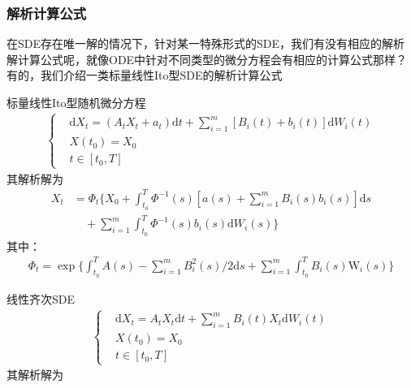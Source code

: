         \subsubsection{解析计算公式}
            \label{subsubsec:解析计算公式}
            \par
            在SDE存在唯一解的情况下，针对某一特殊形式的SDE，我们有没有相应的解析解计算公式呢，就像ODE中针对不同类型的微分方程会有相应的计算公式那样？有的，我们介绍一类标量线性Ito型SDE的解析计算公式
            \par
            标量线性Ito型随机微分方程
            \begin{align*}
                \left\{
                    \begin{aligned}
                    &\mathrm{d}X_t = (A_tX_t +a_t) \mathrm{d}t + \sum_{i = 1}^m[B_i(t) + b_i(t)]\mathrm{d}W_i(t)\\
                    &X(t_0) = X_0\\
                    &t \in [t_0,T]
                    \end{aligned}
                \right.
            \end{align*}
            其解析解为
            \begin{align*}
                X_t &= \varPhi_t\Bigg\{X_0+\int_{t_0}^T \varPhi^{-1}(s)\left[ a(s)+\sum_{i = 1}^m B_i(s)b_i(s)  \right]\mathrm{d}s \\
            &\quad + \sum_{i =1}^m \int_{t_0}^T \varPhi^{-1}(s)b_i(s)\mathrm{d}W_i(s) \Bigg\}
            \end{align*}
            其中：
            \begin{align*}
                \varPhi_t = \exp\Bigg \{ \int_{t_0}^TA(s) - \sum_{i = 1}^mB_i^2(s)/2\mathrm{d}s+\sum_{i = 1}^m\int_{t_0}^TB_i(s)\mathrm{W}_i(s)\Bigg \}
            \end{align*}
            \par
            线性齐次SDE
            \begin{align*}
                \left\{
                    \begin{aligned}
                    &\mathrm{d}X_t = A_tX_t\mathrm{d}t + \sum_{i = 1}^mB_i(t)X_t\mathrm{d}W_i(t)\\
                    &X(t_0) = X_0\\
                    &t\in[t_0,T]
                    \end{aligned}
                \right.
            \end{align*}
            其解析解为
